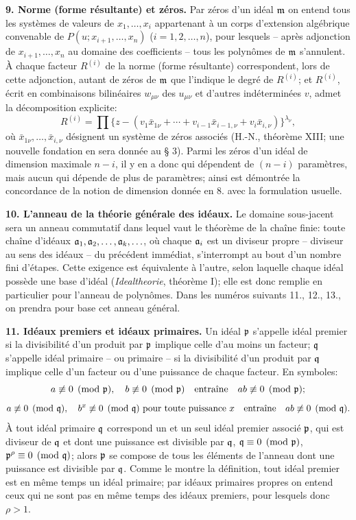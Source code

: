 \textbf{9. Norme (forme résultante) et zéros.} Par zéros d'un idéal $\mathfrak m$ on entend tous les systèmes de valeurs de $x_1,\ldots,x_i$ appartenant à un corps d'extension algébrique convenable de $P(u;x_{i+1},\ldots,x_n)$ ($i=1,2,\ldots,n$), pour lesquels -- après adjonction de $x_{i+1},\ldots,x_n$ au domaine des coefficients -- tous les polynômes de $\mathfrak m$ s'annulent. À chaque facteur $R^{(i)}$ de la norme (forme résultante) correspondent, lors de cette adjonction, autant de zéros de $\mathfrak m$ que l'indique le degré de $R^{(i)}$; et $R^{(i)}$, écrit en combinaisons bilinéaires $w_{\mu\nu}$ des $u_{\mu\nu}$ et d'autres indéterminées $v$, admet la décomposition explicite:
\begin{equation}
 R^{(i)}=\prod\{z-(v_1\bar{x}_{1\nu}+\cdots+v_{i-1}\bar{x}_{i-1,\nu}+v_i\bar{x}_{i,\nu})\}^{\lambda_\nu}, \tag{5}
\end{equation}
où $\bar{x}_{1\nu},\ldots,\bar{x}_{i,\nu}$ désignent un système de zéros associés (H.-N., théorème XIII; une nouvelle fondation en sera donnée au \S{} 3). Parmi les zéros d'un idéal de dimension maximale $n-i$, il y en a donc qui dépendent de $(n-i)$ paramètres, mais aucun qui dépende de plus de paramètres; ainsi est démontrée la concordance de la notion de dimension donnée en 8. avec la formulation usuelle.

\textbf{10. L'anneau de la théorie générale des idéaux.} Le domaine sous-jacent sera un anneau commutatif dans lequel vaut le théorème de la chaîne finie: toute chaîne d'idéaux $\mathfrak a_1,\mathfrak a_2,\ldots,\mathfrak a_k,\ldots$, où chaque $\mathfrak a_i$ est un diviseur propre -- diviseur au sens des idéaux -- du précédent immédiat, s'interrompt au bout d'un nombre fini d'étapes. Cette exigence est équivalente à l'autre, selon laquelle chaque idéal possède une base d'idéal (\emph{Idealtheorie}, théorème I); elle est donc remplie en particulier pour l'anneau de polynômes. Dans les numéros suivants 11., 12., 13., on prendra pour base cet anneau général.

\textbf{11. Idéaux premiers et idéaux primaires.} Un idéal $\mathfrak p$ s'appelle idéal premier si la divisibilité d'un produit par $\mathfrak p$ implique celle d'au moins un facteur; $\mathfrak q$ s'appelle idéal primaire -- ou primaire -- si la divisibilité d'un produit par $\mathfrak q$ implique celle d'un facteur ou d'une puissance de chaque facteur. En symboles:
\[
 a\not\equiv0\pmod{\mathfrak p},\quad b\not\equiv0\pmod{\mathfrak p}\quad\hbox{entraîne}\quad ab\not\equiv0\pmod{\mathfrak p};
\]
\[
 a\not\equiv0\pmod{\mathfrak q},\quad b^x\not\equiv0\pmod{\mathfrak q}\ \hbox{pour toute puissance }x\quad\hbox{entraîne}\quad ab\not\equiv0\pmod{\mathfrak q}.
\]
À tout idéal primaire $\mathfrak q$ correspond un et un seul idéal premier associé $\mathfrak p$, qui est diviseur de $\mathfrak q$ et dont une puissance est divisible par $\mathfrak q$, $\mathfrak q\equiv0\pmod{\mathfrak p}$, $\mathfrak p^\rho\equiv0\pmod{\mathfrak q}$; alors $\mathfrak p$ se compose de tous les éléments de l'anneau dont une puissance est divisible par $\mathfrak q$. Comme le montre la définition, tout idéal premier est en même temps un idéal primaire; par idéaux primaires propres on entend ceux qui ne sont pas en même temps des idéaux premiers, pour lesquels donc $\rho>1$.

